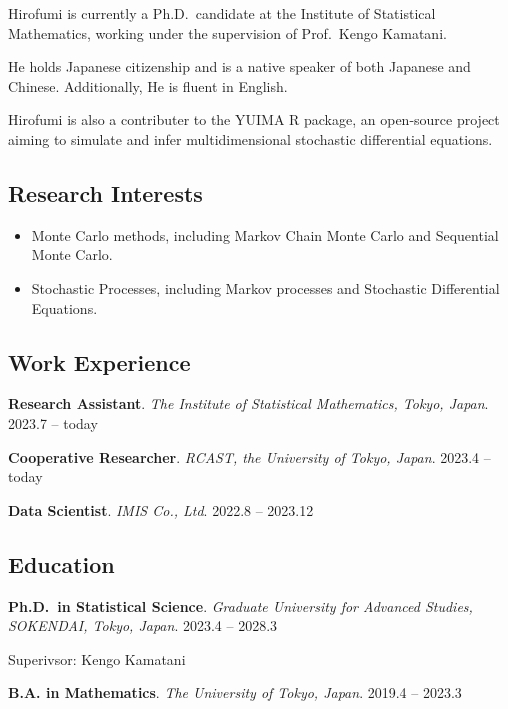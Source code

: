 \documentclass[
]{article}
\providecommand{\tightlist}{%
  \setlength{\itemsep}{0pt}\setlength{\parskip}{0pt}}\usepackage{longtable,booktabs,array}
\begin{document}
Hirofumi is currently a Ph.D.~candidate at the Institute of Statistical
Mathematics, working under the supervision of Prof.~Kengo Kamatani.

He holds Japanese citizenship and is a native speaker of both Japanese
and Chinese. Additionally, He is fluent in English.

Hirofumi is also a contributer to the YUIMA R package, an open-source
project aiming to simulate and infer multidimensional stochastic
differential equations.

\subsection{Research Interests}\label{research-interests}

\begin{itemize}
\tightlist
\item
  Monte Carlo methods, including Markov Chain Monte Carlo and Sequential
  Monte Carlo.
\item
  Stochastic Processes, including Markov processes and Stochastic
  Differential Equations.
\end{itemize}

\subsection{Work Experience}\label{work-experience}

\textbf{Research Assistant}. \emph{The Institute of Statistical
Mathematics, Tokyo, Japan}. \hfill {2023.7 -- today}

\textbf{Cooperative Researcher}. \emph{RCAST, the University of Tokyo,
Japan}. \hfill {2023.4 -- today}

\textbf{Data Scientist}. \emph{IMIS Co., Ltd}. \hfill {2022.8 --
2023.12}

\subsection{Education}\label{education}

\textbf{Ph.D.~in Statistical Science}. \emph{Graduate University for
Advanced Studies, SOKENDAI, Tokyo, Japan}. \hfill {2023.4 -- 2028.3}

\par

Superivsor: Kengo Kamatani

\textbf{B.A. in Mathematics}. \emph{The University of Tokyo, Japan}.
\hfill {2019.4 -- 2023.3}
\end{document}
